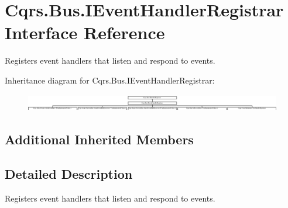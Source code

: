 \hypertarget{interfaceCqrs_1_1Bus_1_1IEventHandlerRegistrar}{}\section{Cqrs.\+Bus.\+I\+Event\+Handler\+Registrar Interface Reference}
\label{interfaceCqrs_1_1Bus_1_1IEventHandlerRegistrar}


Registers event handlers that listen and respond to events.  


Inheritance diagram for Cqrs.\+Bus.\+I\+Event\+Handler\+Registrar\+:\begin{figure}[H]
\begin{center}
\leavevmode
\includegraphics[height=0.763636cm]{interfaceCqrs_1_1Bus_1_1IEventHandlerRegistrar}
\end{center}
\end{figure}
\subsection*{Additional Inherited Members}


\subsection{Detailed Description}
Registers event handlers that listen and respond to events. 

